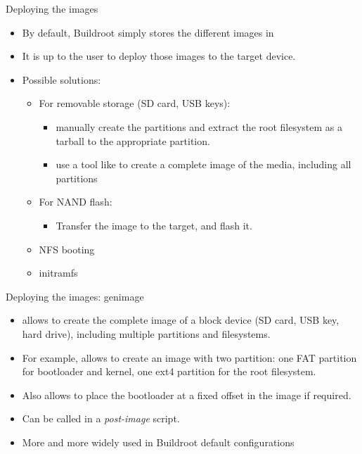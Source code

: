 \begin{frame}{Deploying the images}
  \begin{itemize}
  \item By default, Buildroot simply stores the different images in
  \item It is up to the user to deploy those images to the target
    device.
  \item Possible solutions:
    \begin{itemize}
    \item For removable storage (SD card, USB keys):
      \begin{itemize}
      \item manually create the partitions and extract the root
        filesystem as a tarball to the appropriate partition.
      \item use a tool like  to create a complete image
        of the media, including all partitions
      \end{itemize}
    \item For NAND flash:
      \begin{itemize}
      \item Transfer the image to the target, and flash it.
      \end{itemize}
    \item NFS booting
    \item initramfs
    \end{itemize}
  \end{itemize}
\end{frame}

\begin{frame}{Deploying the images: genimage}
  \begin{itemize}
  \item {} allows to create the complete image of a block
    device (SD card, USB key, hard drive), including multiple
    partitions and filesystems.
  \item For example, allows to create an image with two partition: one
    FAT partition for bootloader and kernel, one ext4 partition for
    the root filesystem.
  \item Also allows to place the bootloader at a fixed offset in the
    image if required.
  \item Can be called in a {\em post-image} script.
  \item More and more widely used in Buildroot default configurations
  \end{itemize}
\end{frame}

